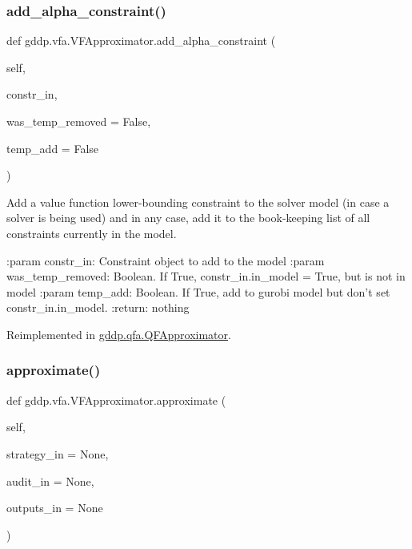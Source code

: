 \subsubsection{\texorpdfstring{add\_alpha\_constraint()}{add\_alpha\_constraint()}}
{\footnotesize\ttfamily def gddp.\+vfa.\+V\+F\+Approximator.\+add\+\_\+alpha\+\_\+constraint (\begin{DoxyParamCaption}\item[{}]{self,  }\item[{}]{constr\+\_\+in,  }\item[{}]{was\+\_\+temp\+\_\+removed = {\ttfamily False},  }\item[{}]{temp\+\_\+add = {\ttfamily False} }\end{DoxyParamCaption})}

\begin{DoxyVerb}Add a value function lower-bounding constraint to the solver model (in case a solver is
being used) and in any case, add it to the book-keeping list of all constraints currently in
the model.

:param constr_in: Constraint object to add to the model
:param was_temp_removed: Boolean. If True, constr_in.in_model = True, but is not in model
:param temp_add: Boolean. If True, add to gurobi model but don't set constr_in.in_model.
:return: nothing
\end{DoxyVerb}
 

Reimplemented in \mbox{\hyperlink{classgddp_1_1qfa_1_1_q_f_approximator_a9a577ac6db94ba649cf8e9be227761cc}{gddp.\+qfa.\+Q\+F\+Approximator}}.

\mbox{\label{classgddp_1_1vfa_1_1_v_f_approximator_a8eab71f7f7d2f248904874fc364fedc5}} 
\subsubsection{\texorpdfstring{approximate()}{approximate()}}
{\footnotesize\ttfamily def gddp.\+vfa.\+V\+F\+Approximator.\+approximate (\begin{DoxyParamCaption}\item[{}]{self,  }\item[{}]{strategy\+\_\+in = {\ttfamily None},  }\item[{}]{audit\+\_\+in = {\ttfamily None},  }\item[{}]{outputs\+\_\+in = {\ttfamily None} }\end{DoxyParamCaption})}

